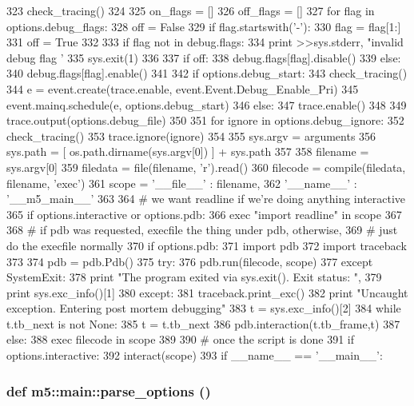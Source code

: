 \begin{DoxyCode}
323         check_tracing()
324 
325         on_flags = []
326         off_flags = []
327         for flag in options.debug_flags:
328             off = False
329             if flag.startswith('-'):
330                 flag = flag[1:]
331                 off = True
332 
333             if flag not in debug.flags:
334                 print >>sys.stderr, "invalid debug flag '%
335                 sys.exit(1)
336 
337             if off:
338                 debug.flags[flag].disable()
339             else:
340                 debug.flags[flag].enable()
341 
342     if options.debug_start:
343         check_tracing()
344         e = event.create(trace.enable, event.Event.Debug_Enable_Pri)
345         event.mainq.schedule(e, options.debug_start)
346     else:
347         trace.enable()
348 
349     trace.output(options.debug_file)
350 
351     for ignore in options.debug_ignore:
352         check_tracing()
353         trace.ignore(ignore)
354 
355     sys.argv = arguments
356     sys.path = [ os.path.dirname(sys.argv[0]) ] + sys.path
357 
358     filename = sys.argv[0]
359     filedata = file(filename, 'r').read()
360     filecode = compile(filedata, filename, 'exec')
361     scope = { '__file__' : filename,
362               '__name__' : '__m5_main__' }
363 
364     # we want readline if we're doing anything interactive
365     if options.interactive or options.pdb:
366         exec "import readline" in scope
367 
368     # if pdb was requested, execfile the thing under pdb, otherwise,
369     # just do the execfile normally
370     if options.pdb:
371         import pdb
372         import traceback
373 
374         pdb = pdb.Pdb()
375         try:
376             pdb.run(filecode, scope)
377         except SystemExit:
378             print "The program exited via sys.exit(). Exit status: ",
379             print sys.exc_info()[1]
380         except:
381             traceback.print_exc()
382             print "Uncaught exception. Entering post mortem debugging"
383             t = sys.exc_info()[2]
384             while t.tb_next is not None:
385                 t = t.tb_next
386                 pdb.interaction(t.tb_frame,t)
387     else:
388         exec filecode in scope
389 
390     # once the script is done
391     if options.interactive:
392         interact(scope)
393 
if __name__ == '__main__':
\end{DoxyCode}
\hypertarget{namespacem5_1_1main_a2bce6a0d2b107fc626748115ead2278d}{
\subsubsection[{parse\_\-options}]{\setlength{\rightskip}{0pt plus 5cm}def m5::main::parse\_\-options ()}}
\label{namespacem5_1_1main_a2bce6a0d2b107fc626748115ead2278d}



